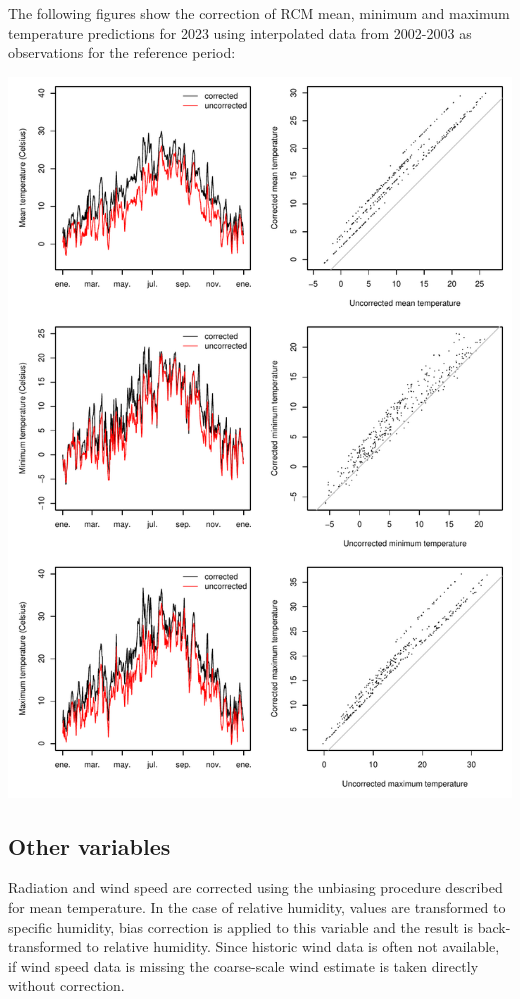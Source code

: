 \documentclass[11pt,a4paper]{article}
\begin{document}
The following figures show the correction of RCM mean, minimum and maximum temperature predictions for 2023 using interpolated data from 2002-2003 as observations for the reference period:
\begin{center}
\includegraphics{Meteorology-020}
\end{center}

\subsection{Other variables}
Radiation and wind speed are corrected using the unbiasing procedure described for mean temperature. In the case of relative humidity, values are transformed to specific humidity, bias correction is applied to this variable and the result is back-transformed to relative humidity. Since historic wind data is often not available, if wind speed data is missing the coarse-scale wind estimate is taken directly without correction.
\end{document}
